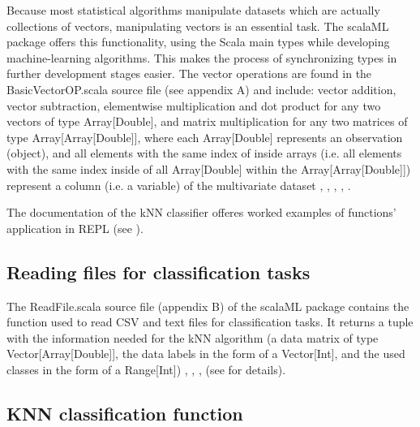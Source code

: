 \documentclass[twoside, 11p]{article}
\begin{document}
Because most statistical algorithms manipulate datasets which are actually collections of vectors, manipulating vectors is an essential task. The scalaML package offers this functionality, using the Scala main types while developing machine-learning algorithms. This makes the process of synchronizing types in further development stages easier.
 The vector operations are found in the BasicVectorOP.scala source file (see appendix A) and include: vector addition, vector subtraction, elementwise multiplication and dot product for any two vectors of type Array[Double], and matrix multiplication for any two matrices of type Array[Array[Double]], where each Array[Double] represents an observation (object), and all elements with the same index of inside arrays (i.e. all elements with the same index inside of all Array[Double] within the Array[Array[Double]]) represent a column (i.e. a variable) of the multivariate dataset \cite{dawkins_pauls_2005}, \cite{odersky_programming_2010}, \cite{swartz_learning_2015}, \cite{trask_grokking_2017}, \cite{noauthor_scala_2003}.

The documentation of the kNN classifier offeres worked examples of functions' application in REPL (see \cite{tesileanu_introduction_2017}).

\subsection{Reading files for classification tasks}

The ReadFile.scala source file (appendix B) of the scalaML package contains the function used to read CSV and text files for classification tasks. It returns a tuple with the information needed for the kNN algorithm (a data matrix of type Vector[Array[Double]], the data labels in the form of a Vector[Int],  and the used classes in the form of a Range[Int]) \cite{harrington_machine_2012}, \cite{odersky_programming_2010}, \cite{swartz_learning_2015}, \cite{noauthor_scala_2003} (see \cite{tesileanu_introduction_2017} for details).
 
\subsection{KNN classification function}
\end{document}
